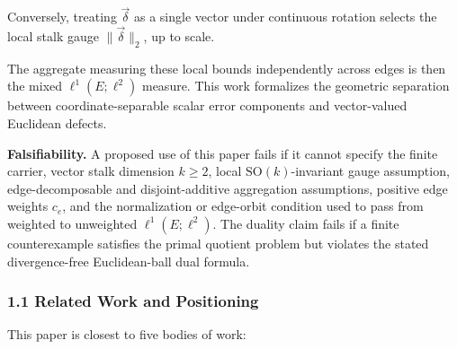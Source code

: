 \documentclass[
  11pt,
]{article}
\begin{document}
Conversely, treating \(\vec{\delta}\) as a single vector under
continuous rotation selects the local stalk gauge
\(\|\vec{\delta}\|_2\), up to scale.

The aggregate measuring these local bounds independently across edges is
then the mixed \(\ell^1(E; \ell^2)\) measure. This work formalizes the
geometric separation between coordinate-separable scalar error
components and vector-valued Euclidean defects.

\textbf{Falsifiability.} A proposed use of this paper fails if it cannot
specify the finite carrier, vector stalk dimension \(k\ge2\), local
\(\mathrm{SO}(k)\)-invariant gauge assumption, edge-decomposable and
disjoint-additive aggregation assumptions, positive edge weights
\(c_e\), and the normalization or edge-orbit condition used to pass from
weighted to unweighted \(\ell^1(E;\ell^2)\). The duality claim fails if
a finite counterexample satisfies the primal quotient problem but
violates the stated divergence-free Euclidean-ball dual formula.

\subsubsection{1.1 Related Work and
Positioning}\label{related-work-and-positioning}

This paper is closest to five bodies of work:
\end{document}
